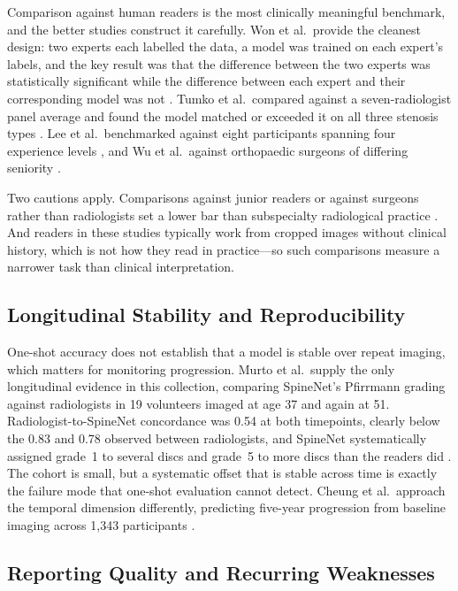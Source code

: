 Comparison against human readers is the most clinically meaningful benchmark, and
the better studies construct it carefully. Won et al.\ provide the cleanest
design: two experts each labelled the data, a model was trained on each expert's
labels, and the key result was that the difference between the two experts was
statistically significant while the difference between each expert and their
corresponding model was not \cite{won2020spinal}. Tumko et al.\ compared against
a seven-radiologist panel average and found the model matched or exceeded it on
all three stenosis types \cite{tumko2024a}. Lee et al.\ benchmarked against eight
participants spanning four experience levels \cite{lee2026deep}, and Wu et al.\
against orthopaedic surgeons of differing seniority \cite{wu2026external}.

Two cautions apply. Comparisons against junior readers or against surgeons rather
than radiologists set a lower bar than subspecialty radiological practice
\cite{ke2025integrating,wu2026external}. And readers in these studies typically
work from cropped images without clinical history, which is not how they read in
practice---so such comparisons measure a narrower task than clinical
interpretation.

\subsection{Longitudinal Stability and Reproducibility}
\label{sec:lr-longitudinal}

One-shot accuracy does not establish that a model is stable over repeat imaging,
which matters for monitoring progression. Murto et al.\ supply the only
longitudinal evidence in this collection, comparing SpineNet's Pfirrmann grading
against radiologists in 19 volunteers imaged at age 37 and again at 51.
Radiologist-to-SpineNet concordance was 0.54 at both timepoints, clearly below
the 0.83 and 0.78 observed between radiologists, and SpineNet systematically
assigned grade~1 to several discs and grade~5 to more discs than the readers did
\cite{murto2025comparison}. The cohort is small, but a systematic offset that is
stable across time is exactly the failure mode that one-shot evaluation cannot
detect. Cheung et al.\ approach the temporal dimension differently, predicting
five-year progression from baseline imaging across 1{,}343 participants
\cite{cheung2022learningbased}.

\subsection{Reporting Quality and Recurring Weaknesses}
\label{sec:lr-reporting}

